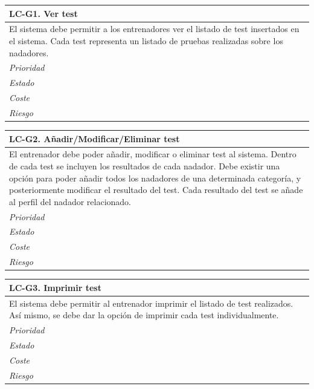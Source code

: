 	\begin{center}
		\begin{tabularx}{15cm}{|X|}
			\hline 
				\bf{LC-G1. Ver test}\\
			\hline
				El sistema debe permitir a los entrenadores ver el listado de test insertados en el sistema. Cada test representa un listado de pruebas realizadas sobre los nadadores.\\
			\hline
				\it{Prioridad}\\
			\hline
				\it{Estado}\\
			\hline
				\it{Coste}\\
			\hline
				\it{Riesgo}\\
			\hline
		\end{tabularx}
	\end{center}
	
	\begin{center}
		\begin{tabularx}{15cm}{|X|}
			\hline 
				\bf{LC-G2. Añadir/Modificar/Eliminar test}\\
			\hline
				El entrenador debe poder añadir, modificar o eliminar test al sistema. Dentro de cada test se incluyen los resultados de cada nadador. Debe existir una opción para poder añadir todos los nadadores de una determinada categoría, y posteriormente modificar el resultado del test. Cada resultado del test se añade al perfil del nadador relacionado.\\
			\hline
				\it{Prioridad}\\
			\hline
				\it{Estado}\\
			\hline
				\it{Coste}\\
			\hline
				\it{Riesgo}\\
			\hline
		\end{tabularx}
	\end{center}
	
	\begin{center}
		\begin{tabularx}{15cm}{|X|}
			\hline 
				\bf{LC-G3. Imprimir test}\\
			\hline
				El sistema debe permitir al entrenador imprimir el listado de test realizados. Así mismo, se debe dar la opción de imprimir cada test individualmente.\\
			\hline
				\it{Prioridad}\\
			\hline
				\it{Estado}\\
			\hline
				\it{Coste}\\
			\hline
				\it{Riesgo}\\
			\hline
		\end{tabularx}
	\end{center}
	
